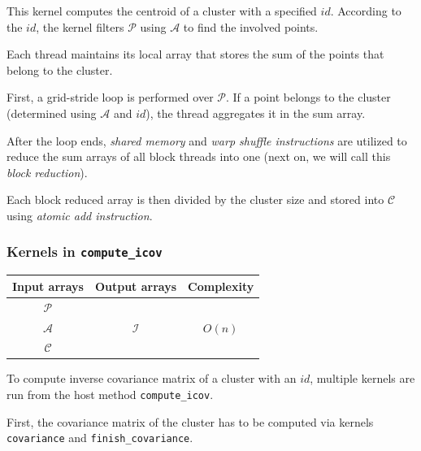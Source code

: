 This kernel computes the centroid of a cluster with a specified $id$. According to the $id$, the kernel filters $\mathcal{P}$ using $\mathcal{A}$ to find the involved points.

Each thread maintains its local array that stores the sum of the points that belong to the cluster. 

First, a grid-stride loop is performed over $\mathcal{P}$. If a point belongs to the cluster (determined using $\mathcal{A}$ and $id$), the thread aggregates it in the sum array. 

After the loop ends, \emph{shared memory} and \emph{warp shuffle instructions} are utilized to reduce the sum arrays of all block threads into one (next on, we will call this \emph{block reduction}).

Each block reduced array is then divided by the cluster size and stored into $\mathcal{C}$ using \emph{atomic add instruction}. 

\subsubsection{Kernels in \texttt{compute\_icov}}

\begin{table}[h]
	\centering
	\begin{tabular}{ccc}
		\toprule
		\textbf{Input arrays} & \textbf{Output arrays} & \textbf{Complexity} \\ \midrule
		    $\mathcal{P}$     &                        &                     \\
		    $\mathcal{A}$     &     $\mathcal{I}$      &       $O(n)$        \\
		    $\mathcal{C}$     &                        &                     \\ \bottomrule
	\end{tabular}
\end{table}

To compute inverse covariance matrix of a cluster with an $id$, multiple kernels are run from the host method \texttt{compute\_icov}. 

First, the covariance matrix of the cluster has to be computed via kernels \texttt{covariance} and \texttt{finish\_covariance}. 

